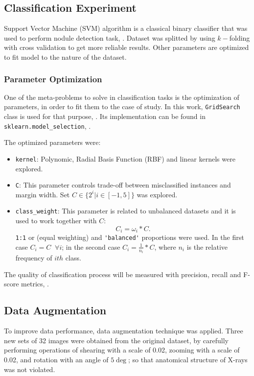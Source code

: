 \documentclass{article}
\begin{document}
\subsection{Classification Experiment}

Support Vector Machine (SVM) algorithm is a classical binary classifier that was used to perform nodule detection task, \citep{svminproceedings}. Dataset was splitted by using $k-$folding with cross validation to get more reliable results. Other parameters are optimized to fit model to the nature of the dataset. 

\subsubsection{Parameter Optimization}

One of the meta-problems to solve in classification tasks is the optimization of parameters, in order to fit them to the case of study. In this work, \lstinline|GridSearch| class is used for that purpose, \citep{gridsearch}. Its implementation can be found in \lstinline|sklearn.model_selection|, \citep{scikit-learn}.

The optimized parameters were:
\begin{itemize}
	\item \lstinline|kernel|: Polynomic, Radial Basis Function (RBF) and linear kernels were explored. 
	\item \lstinline|C|: This parameter controls trade-off between misclassified instances and margin width. Set $C \in \{ 2^i | i \in \left[-1, 5 \right] \}$ was explored. 
	\item \lstinline|class_weight|: This parameter is related to unbalanced datasets and it is used to work together with $C$:
	\begin{equation}
		C_i=\omega_i*C.
	\end{equation}
	\lstinline|1:1| or (equal weighting) and \lstinline|'balanced'| proportions were used. In the first case $C_i = C \;\; \forall i$; in the second case $C_i=\frac{1}{n_i}*C$, where $n_i$ is the relative frequency of $ith$ class. 
\end{itemize}

The quality of classification process will be measured with precision, recall and F-score metrics, \citep{metrics}. 

\subsection{Data Augmentation}
To improve data performance, data augmentation technique was applied. Three new sets of 32 images were obtained from the original dataset, by carefully performing operations of shearing with a scale of 0.02, zooming with a scale of 0.02, and rotation with an angle of $5\deg$; so that anatomical structure of X-rays was not violated. 
\end{document}
